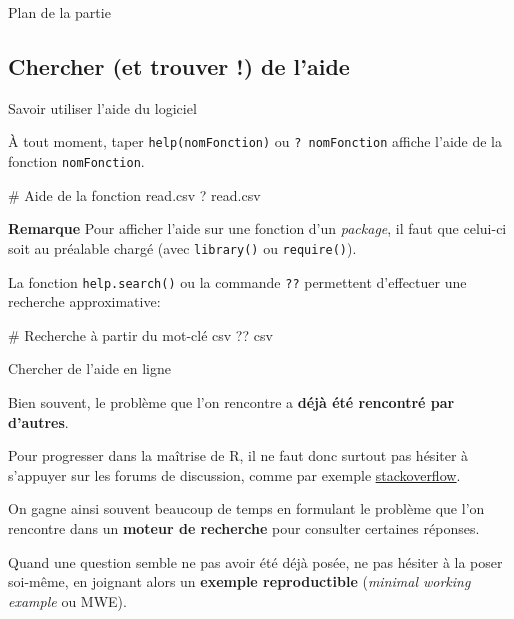 \documentclass[12pt,handout,ignorenonframetext,]{beamer}
\newenvironment{Shaded}{}{}
\newcommand{\CommentTok}[1]{\textcolor[rgb]{0.00,0.50,0.00}{#1}}
\newcommand{\NormalTok}[1]{#1}
\renewenvironment{Shaded}{\begin{snugshade}}{\end{snugshade}}
\begin{document}
\begin{frame}{Plan de la partie}

\Large 
\tableofcontents[currentsection, sectionstyle = hide, subsectionstyle = show/show/hide]

\end{frame}

\subsection{Chercher (et trouver !) de
l'aide}\label{chercher-et-trouver-de-laide}

\begin{frame}[fragile]{Savoir utiliser l'aide du logiciel}

À tout moment, taper \texttt{help(nomFonction)} ou
\texttt{?\ nomFonction} affiche l'aide de la fonction
\texttt{nomFonction}.

\begin{Shaded}
\begin{Highlighting}[]
\CommentTok{# Aide de la fonction read.csv}
\NormalTok{? read.csv}
\end{Highlighting}
\end{Shaded}

\pause 

\textbf{Remarque} Pour afficher l'aide sur une fonction d'un
\emph{package}, il faut que celui-ci soit au préalable chargé (avec
\texttt{library()} ou \texttt{require()}).

\pause La fonction \texttt{help.search()} ou la commande \texttt{??}
permettent d'effectuer une recherche approximative:

\begin{Shaded}
\begin{Highlighting}[]
\CommentTok{# Recherche à partir du mot-clé csv}
\NormalTok{?? csv}
\end{Highlighting}
\end{Shaded}

\end{frame}

\begin{frame}{Chercher de l'aide en ligne}

Bien souvent, le problème que l'on rencontre a \textbf{déjà été
rencontré par d'autres}.

\bigskip
Pour progresser dans la maîtrise de R, il ne faut donc surtout pas
hésiter à s'appuyer sur les forums de discussion, comme par exemple
\href{http://stackoverflow.com/questions/tagged/r}{\underline{stackoverflow}}.

\pause \bigskip
On gagne ainsi souvent beaucoup de temps en formulant le problème que
l'on rencontre dans un \textbf{moteur de recherche} pour consulter
certaines réponses.

\bigskip  Quand une question semble ne pas avoir été déjà posée, ne pas
hésiter à la poser soi-même, en joignant alors un \textbf{exemple
reproductible} (\emph{minimal working example} ou MWE).

\end{frame}
\end{document}
